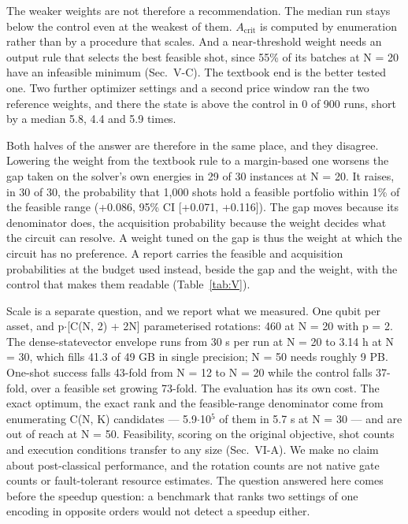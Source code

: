 \documentclass{ieeeaccess}
\begin{document}
The weaker weights are not therefore a recommendation. The median run stays below the control even at the weakest of them. $A_{\mathrm{crit}}$ is computed by enumeration rather than by a procedure that scales. And a near-threshold weight needs an output rule that selects the best feasible shot, since 55\% of its batches at N = 20 have an infeasible minimum (Sec.~V-C). The textbook end is the better tested one. Two further optimizer settings and a second price window ran the two reference weights, and there the state is above the control in 0 of 900 runs, short by a median 5.8, 4.4 and 5.9 times.


Both halves of the answer are therefore in the same place, and they disagree. Lowering the weight from the textbook rule to a margin-based one worsens the gap taken on the solver's own energies in 29 of 30 instances at N = 20. It raises, in 30 of 30, the probability that 1,000 shots hold a feasible portfolio within 1\% of the feasible range (+0.086, 95\% CI [+0.071, +0.116]). The gap moves because its denominator does, the acquisition probability because the weight decides what the circuit can resolve. A weight tuned on the gap is thus the weight at which the circuit has no preference. A report carries the feasible and acquisition probabilities at the budget used instead, beside the gap and the weight, with the control that makes them readable (Table~\ref{tab:V}).


Scale is a separate question, and we report what we measured. One qubit per asset, and p$\cdot$[C(N, 2) + 2N] parameterised rotations: 460 at N = 20 with p = 2. The dense-statevector envelope runs from 30 s per run at N = 20 to 3.14 h at N = 30, which fills 41.3 of 49 GB in single precision; N = 50 needs roughly 9 PB. One-shot success falls 43-fold from N = 12 to N = 20 while the control falls 37-fold, over a feasible set growing 73-fold. The evaluation has its own cost. The exact optimum, the exact rank and the feasible-range denominator come from enumerating C(N, K) candidates --- 5.9$\cdot$10$^{5}$ of them in 5.7 s at N = 30 --- and are out of reach at N = 50. Feasibility, scoring on the original objective, shot counts and execution conditions transfer to any size (Sec.~VI-A). We make no claim about post-classical performance, and the rotation counts are not native gate counts or fault-tolerant resource estimates. The question answered here comes before the speedup question: a benchmark that ranks two settings of one encoding in opposite orders would not detect a speedup either.
\end{document}

